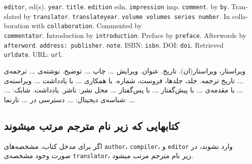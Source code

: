\documentclass[a4paper,11pt]{article}
\begin{document}
\begin{itemize}[nosep]
\begin{latin}
\item[] []
{\tt editor}, ed(s). {\tt year}. {\tt title}. {\tt edition} edn. {\tt impression} imp. {\tt comment}. by {\tt by}. Translated by {\tt translator}. {\tt translateyear}. {\tt volume volumes series number}. In collaboration with {\tt collaboration}. Commented by \\{\tt commentator}. Introduction by {\tt introduction}. Preface by {\tt preface}. Afterwords by {\tt afterword}. {\tt address: publisher}. {\tt note}. ISBN: {\tt isbn}. DOI: {\tt doi}. Retrieved {\tt urldate}. URL: {\tt url}. 
\end{latin}

\item[] []
{\persianttfamily ویراستار}، ویراستار(ان). {\persianttfamily تاریخ}. {\persianttfamily عنوان}. ویرایش {\persianttfamily …}. چاپ {\persianttfamily …}. {\persianttfamily توضیح}. نوشته‌ی {\persianttfamily …}. ترجمه‌ی {\persianttfamily …}. {\persianttfamily تاریخ ترجمه}. {\persianttfamily جلد، جلدها، فروست، شماره}. با همکاری {\persianttfamily …}. با یادداشت {\persianttfamily …}. ویراسته‌ی {\persianttfamily …}. با مقدمه‌ی {\persianttfamily …}. با پیش‌گفتار {\persianttfamily …}. با پس‌گفتار {\persianttfamily …}. {\persianttfamily محل نشر: ناشر}. {\persianttfamily یادداشت}. شابک: {\persianttfamily …}. شناسه‌ی دیجیتال: {\persianttfamily …}. دسترسی در {\persianttfamily …}. تارنما: {\persianttfamily …}.
\end{itemize}





\subsection{کتابهایی که زیر نام مترجم مرتب میشوند}
اگر برای مدخل کتاب، مشخصه‌های \verb|author|، \verb|compiler|، و \verb|editor| وارد نشوند، در صورت وجود مشخصه‌ی \verb|translator|، زیر نام مترجم مرتب میشود.
\end{document}
